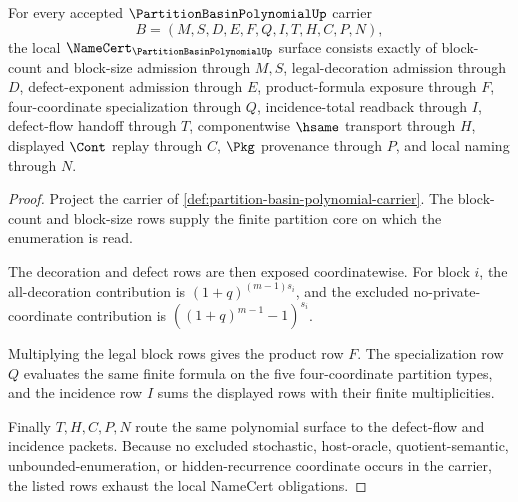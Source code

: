 \begin{theorem}
\label{thm:partition-basin-polynomial-namecert-obligations}
For every accepted $\PartitionBasinPolynomialUp$ carrier
$$
B=(M,S,D,E,F,Q,I,T,H,C,P,N),
$$
the local $\NameCert_{\PartitionBasinPolynomialUp}$ surface consists exactly of block-count and block-size admission through $M,S$, legal-decoration admission through $D$, defect-exponent admission through $E$, product-formula exposure through $F$, four-coordinate specialization through $Q$, incidence-total readback through $I$, defect-flow handoff through $T$, componentwise $\hsame$ transport through $H$, displayed $\Cont$ replay through $C$, $\Pkg$ provenance through $P$, and local naming through $N$.
\end{theorem}
\begin{proof}
Project the carrier of \autoref{def:partition-basin-polynomial-carrier}. The block-count and block-size rows supply the finite partition core on which the enumeration is read.

The decoration and defect rows are then exposed coordinatewise. For block $i$, the all-decoration contribution is $(1+q)^{(m-1)s_{i}}$, and the excluded no-private-coordinate contribution is $\left((1+q)^{m-1}-1\right)^{s_{i}}$.

Multiplying the legal block rows gives the product row $F$. The specialization row $Q$ evaluates the same finite formula on the five four-coordinate partition types, and the incidence row $I$ sums the displayed rows with their finite multiplicities.

Finally $T,H,C,P,N$ route the same polynomial surface to the defect-flow and incidence packets. Because no excluded stochastic, host-oracle, quotient-semantic, unbounded-enumeration, or hidden-recurrence coordinate occurs in the carrier, the listed rows exhaust the local NameCert obligations.
\end{proof}

